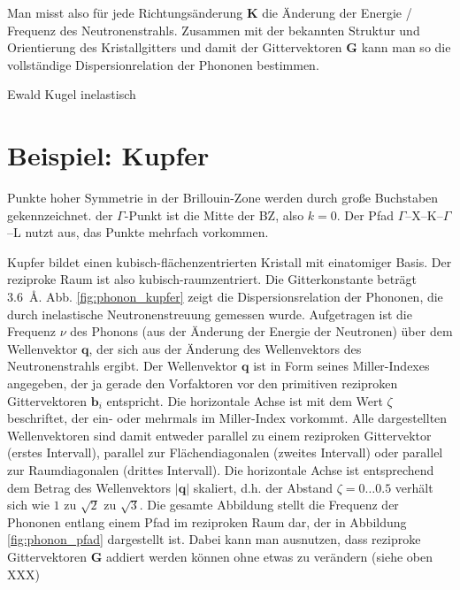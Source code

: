 Man misst also für jede Richtungsänderung $\mathbf{K}$ die Änderung der Energie / Frequenz des Neutronenstrahls. Zusammen mit der bekannten Struktur und Orientierung des Kristallgitters und damit der Gittervektoren $\mathbf{G}$ kann man so die vollständige Dispersionrelation der Phononen bestimmen.

\begin{marginfigure}
\caption{Ewald Kugel inelastisch}
\end{marginfigure}





\section{Beispiel: Kupfer}




\begin{marginfigure}
\caption{Punkte hoher Symmetrie in der Brillouin-Zone werden durch große Buchstaben gekennzeichnet. der $\Gamma$-Punkt ist die Mitte der BZ, also $k=0$. Der Pfad $\Gamma$--X--K--$\Gamma$--L nutzt aus, das Punkte mehrfach  vorkommen. \label{fig:phonon_pfad} }
\end{marginfigure}


Kupfer bildet einen kubisch-flächenzentrierten Kristall mit einatomiger Basis. Der reziproke Raum ist also kubisch-raumzentriert. Die Gitterkonstante beträgt 3.6~\AA. Abb. \ref{fig:phonon_kupfer} zeigt die Dispersionsrelation der Phononen, die durch inelastische Neutronenstreuung gemessen wurde. Aufgetragen ist die Frequenz $\nu$ des Phonons (aus der Änderung der Energie der Neutronen) über dem Wellenvektor $\mathbf{q}$, der sich aus der Änderung des Wellenvektors des Neutronenstrahls ergibt. Der Wellenvektor $\mathbf{q}$ ist in Form seines Miller-Indexes angegeben, der ja gerade den Vorfaktoren vor den primitiven reziproken Gittervektoren $\mathbf{b}_i$ entspricht. Die horizontale Achse ist mit dem Wert $\zeta$ beschriftet, der ein- oder mehrmals im Miller-Index vorkommt. Alle
 dargestellten Wellenvektoren sind damit entweder parallel zu einem reziproken Gittervektor (erstes Intervall), parallel zur Flächendiagonalen (zweites Intervall) oder parallel zur Raumdiagonalen (drittes Intervall). Die horizontale Achse ist entsprechend dem Betrag des Wellenvektors 
 $|\mathbf{q}|$ skaliert, d.h. der Abstand $\zeta = 0 \dots 0.5$ verhält sich wie $1$ zu $\sqrt{2}$ zu $\sqrt{3}$. Die gesamte Abbildung stellt die Frequenz der Phononen entlang einem Pfad im reziproken Raum dar, der in Abbildung \ref{fig:phonon_pfad}  dargestellt ist. Dabei kann man ausnutzen, dass reziproke Gittervektoren $\mathbf{G}$ addiert werden können ohne etwas  zu verändern (siehe oben XXX)
 
